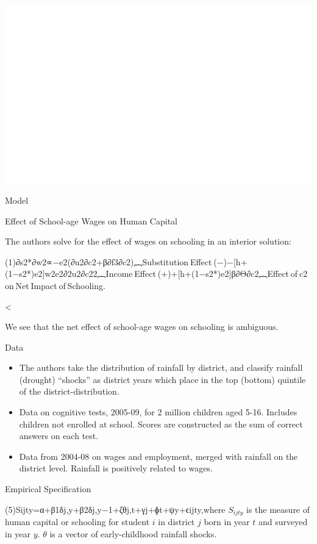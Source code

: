 \documentclass[ignorenonframetext,]{beamer}
\providecommand{\tightlist}{%
  \setlength{\itemsep}{0pt}\setlength{\parskip}{0pt}}
\begin{document}
\begin{frame}{\includegraphics{shah2017_files/figure-beamer/authors model-1.pdf}}
\begin{block}{Model}
\end{block}

\begin{block}{Effect of School-age Wages on Human Capital}

The authors solve for the effect of wages on schooling in an interior
solution:

(1)∂s2*∂w2∝−e2(∂u2∂c2+β∂f3∂c2)︷Substitution Effect (−)−{[}h+(1−s2*)e2{]}w2e2∂2u2∂c22︷Income Effect (+)+{[}h+(1−s2*)e2{]}β∂Θ∂c2︷Effect of c2 on Net Impact of Schooling.

\textless{}

We see that the net effect of school-age wages on schooling is
ambiguous.

\end{block}

\end{frame}

\begin{frame}

\begin{block}{Data}

\begin{itemize}[<+->]
\tightlist
\item
  The authors take the distribution of rainfall by district, and
  classify rainfall (drought) ``shocks'' as district years which place
  in the top (bottom) quintile of the district-distribution.
\end{itemize}

\begin{itemize}[<+->]
\tightlist
\item
  Data on cognitive tests, 2005-09, for 2 million children aged 5-16.
  Includes children not enrolled at school. Scores are constructed as
  the sum of correct answers on each test.
\end{itemize}

\begin{itemize}[<+->]
\tightlist
\item
  Data from 2004-08 on wages and employment, merged with rainfall on the
  district level. Rainfall is positively related to wages.
\end{itemize}

\end{block}

\end{frame}

\begin{frame}

\begin{block}{Empirical Specification}

\protect\hypertarget{df18}{}{(5)Sijty=α+β1δj,y+β2δj,y−1+ζθj,t+γj+ɸt+ψy+ϵijty,}where
\(S_{ijty}\) is the measure of human capital or schooling for student
\(i\) in district \(j\) born in year \(t\) and surveyed in year \(y\).
\(\theta\) is a vector of early-childhood rainfall shocks.

\end{block}

\end{frame}
\end{document}
